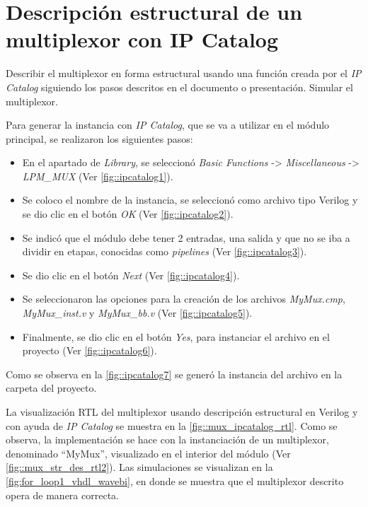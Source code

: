 \section{Descripción estructural de un multiplexor con IP Catalog \label{sec:s2}}

\begin{center}
	\begin{minipage}{12cm}
		\begin{tcolorbox}[title=Actividad 2]
			Describir el multiplexor en forma estructural usando una función creada por el \textit{IP Catalog} siguiendo los pasos descritos en el documento o presentación. Simular el multiplexor.
		\end{tcolorbox}	
	\end{minipage}
\end{center}

Para generar la instancia con \textit{IP Catalog}, que se va a utilizar en el módulo principal, se realizaron los siguientes pasos:

\begin{itemize}
	\item En el apartado de \textit{Library}, se seleccionó \textit{Basic Functions} -> \textit{Miscellaneous} -> \textit{LPM_MUX} (Ver \autoref{fig::ipcatalog1}).
	\item Se coloco el nombre de la instancia, se seleccionó como archivo tipo Verilog y se dio clic en el botón \textit{OK} (Ver \autoref{fig::ipcatalog2}).
	\item Se indicó que el módulo debe tener 2 entradas, una salida y que no se iba a dividir en etapas, conocidas como \textit{pipelines} (Ver \autoref{fig::ipcatalog3}).
	\item Se dio clic en el botón \textit{Next} (Ver \autoref{fig::ipcatalog4}).
	\item Se seleccionaron las opciones para la creación de los archivos \textit{MyMux.cmp}, \textit{MyMux_inst.v} y \textit{MyMux_bb.v} (Ver \autoref{fig::ipcatalog5}).
	\item Finalmente, se dio clic en el botón \textit{Yes}, para instanciar el archivo en el proyecto (Ver \autoref{fig::ipcatalog6}).
\end{itemize}

Como se observa en la \autoref{fig::ipcatalog7} se generó la instancia del archivo en la carpeta del proyecto.

La visualización RTL del multiplexor usando descripción estructural en Verilog y con ayuda de \textit{IP Catalog} se muestra en la \autoref{fig::mux_ipcatalog_rtl}. Como se observa, la implementación se hace con la instanciación de un multiplexor, denominado ``MyMux'', visualizado en el interior del módulo (Ver \autoref{fig::mux_str_des_rtl2}). Las simulaciones se visualizan en la \autoref{fig:for_loop1_vhdl_wavebi}, en donde se muestra que el multiplexor descrito opera de manera correcta.


